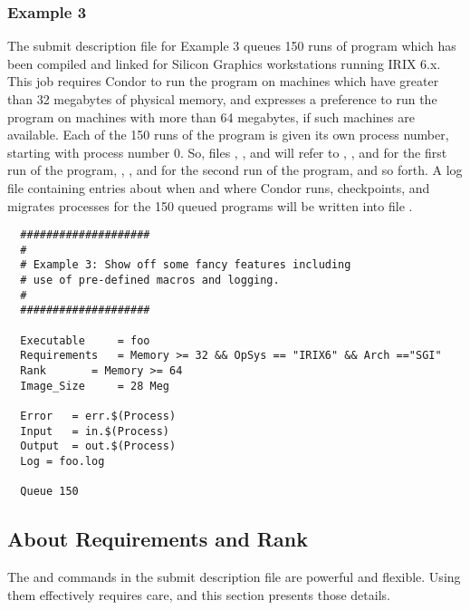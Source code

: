 \subsubsection{Example 3}

The submit description file for Example 3 queues 150
runs of program  which has been compiled and linked for
Silicon Graphics workstations running IRIX 6.x. 
This job requires Condor 
to run the program on machines which have greater than 32 megabytes of
physical memory, and expresses a preference to run the program
on machines with more than 64 megabytes, if such machines are available.
Each of the 150 runs of the program is given its own process number,
starting with process number 0.
So, files 
, , and  will
refer to , , and  for the first run
of the program,
, ,
and  for the second run of the program, and so forth.
A log file containing entries
about when and where Condor runs, checkpoints, and migrates processes for
the 150 queued programs
will be written into file .
\begin{verbatim}
  ####################                    
  #
  # Example 3: Show off some fancy features including
  # use of pre-defined macros and logging.
  #
  ####################                                                    

  Executable     = foo                                                    
  Requirements   = Memory >= 32 && OpSys == "IRIX6" && Arch =="SGI"     
  Rank		 = Memory >= 64
  Image_Size     = 28 Meg                                                 

  Error   = err.$(Process)                                                
  Input   = in.$(Process)                                                 
  Output  = out.$(Process)                                                
  Log = foo.log

  Queue 150
\end{verbatim}


\subsection{About Requirements and Rank}

The 
 and  commands in the submit description file
are powerful and flexible. 
Using them effectively requires care, and this section presents
those details.


